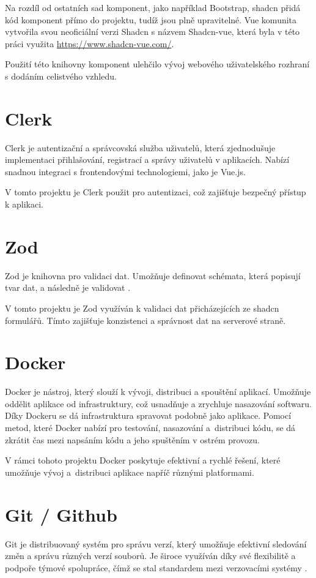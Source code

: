 Na rozdíl od ostatních sad komponent, jako například Bootstrap, shadcn přidá kód komponent přímo do projektu, tudíž jsou plně upravitelné. Vue komunita vytvořila svou neoficiální verzi Shadcn s názvem Shadcn-vue, která byla v této práci využita \url{https://www.shadcn-vue.com/}.

Použití této knihovny komponent ulehčilo vývoj webového uživatelského rozhraní s dodáním celistvého vzhledu.

\section{Clerk}
Clerk je autentizační a správcovská služba uživatelů, která zjednodušuje implementaci přihlašování, registrací a správy uživatelů v aplikacích. Nabízí snadnou integraci s frontendovými technologiemi, jako je Vue.js\cite{clerkClerkAuthentication}. 

V tomto projektu je Clerk použit pro autentizaci, což zajišťuje bezpečný přístup k aplikaci.

\section{Zod}
Zod je knihovna pro validaci dat. Umožňuje definovat schémata, která popisují tvar dat, a následně je validovat \cite{zodTypeScriptfirstSchema}.

V tomto projektu je Zod využíván k validaci dat přicházejících ze shadcn formulářů. Tímto zajišťuje konzistenci a správnost dat na serverové straně.

\section{Docker}
Docker je nástroj, který slouží k vývoji, distribuci a spouštění aplikací. Umožňuje oddělit aplikace od infrastruktury, což usnadňuje a zrychluje nasazování softwaru. Díky Dockeru se dá infrastruktura spravovat podobně jako aplikace. Pomocí metod, které Docker nabízí pro testování, nasazování a~distribuci kódu, se dá zkrátit čas mezi napsáním kódu a jeho spuštěním v ostrém provozu\cite{a2024_what}.

V rámci tohoto projektu Docker poskytuje efektivní a rychlé řešení, které umožňuje vývoj a~distribuci aplikace napříč různými platformami.

\section{Git / Github}
Git je distribuovaný systém pro správu verzí, který umožňuje efektivní sledování změn a správu různých verzí souborů. Je široce využíván díky své flexibilitě a podpoře týmové spolupráce, čímž se stal standardem mezi verzovacími systémy \cite{spinellis2012git}.

